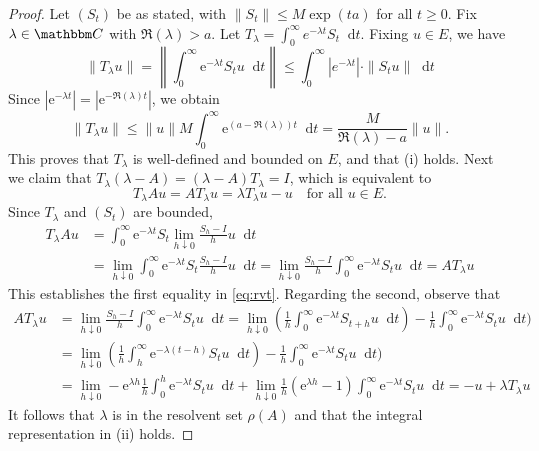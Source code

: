 \documentclass[12pt, reqno]{amsart}
\renewcommand{\leq}{\leqslant}
\renewcommand{\geq}{\geqslant}
\newcommand{\1}{\mathbbm 1}
\newcommand{\me}{{\mathrm e}}
\newcommand*\diff{\mathop{}\!\mathrm{d}}
\newcommand{\CC}{\mathbbm C}
\theoremstyle{plain}
\theoremstyle{definition}
\begin{document}
\begin{proof}
    Let $(S_t)$ be as stated, with $\|S_t\| \leq M \exp(ta)$ for all $t \geq 0$.
    Fix $\lambda \in \CC$ with $\Re(\lambda) > a$. Let
    $T_{\lambda}=\int_{0}^{\infty} e^{-\lambda t}S_t \diff t$.
    Fixing $u\in E$, we have
    \begin{equation*}
        \|T_{\lambda}u\|
        = \left\|
                \int_0^\infty \me^{-\lambda t} S_tu \diff t 
            \right\|
            \leq \int_{0}^{\infty} |e^{-\lambda t} | \cdot \|S_tu\| \diff t
    \end{equation*}
    Since $|\me^{-\lambda t}| = |\me^{- \Re(\lambda) t}|$, we obtain
    \begin{equation*}
        \|T_{\lambda}u\|
        \leq  \|u\| M \int_0^\infty \me^{(a-\Re(\lambda)) t} \diff   t
        = \frac{M}{\Re(\lambda)-a} \|u\| .
    \end{equation*}
    This proves that $T_{\lambda}$ is well-defined and bounded on $E$, and that
    (i) holds.  Next we claim that
	$T_{\lambda}(\lambda - A)  = (\lambda - A)T_{\lambda} = I$,
    which is equivalent to 
    \begin{equation}\label{eq:rvt}
        T_{\lambda}Au = AT_{\lambda}u = \lambda T_{\lambda}u-u
        \quad \text{for all } u \in E.
    \end{equation}
    Since $T_{\lambda}$ and $(S_t)$ are bounded,
    \begin{align*}
    	T_{\lambda} Au
    	& = \int_{0}^{\infty} \me^{-\lambda t}S_t \lim_{h \downarrow 0}
            \frac{S_h-I}{h}u\diff t
        \\
    	& = \lim_{h \downarrow 0}\int_{0}^{\infty} \me^{-\lambda t}S_t 
            \frac{S_h-I}{h}u\diff t
    	= \lim_{h \downarrow 0}\frac{S_h-I}{h}
            \int_0^\infty \me^{-\lambda t}S_t u\diff t = AT_{\lambda}u
    \end{align*}
    This establishes the first equality in \eqref{eq:rvt}.  Regarding the
    second, observe that
    \begin{align*}
       AT_{\lambda}u &
        = \lim_{h \downarrow 0}\frac{S_h-I}{h}
            \int_{0}^{\infty} \me^{-\lambda t}S_t u\diff t 
            = \lim_{h \downarrow 0}
            (\frac{1}{h}\int_{0}^{\infty} \me^{-\lambda t}S_{t+h} u\diff t)
            - \frac{1}{h}\int_{0}^{\infty} \me^{-\lambda t}S_t u\diff t)
        \\
       & = \lim_{h \downarrow 0}(\frac{1}{h}\int_{h}^{\infty} \me^{-\lambda( t-h)}S_{t} u\diff t)
         -\frac{1}{h}\int_{0}^{\infty} \me^{-\lambda t}S_t u\diff t)\\
       & = \lim_{h \downarrow 0}- \me^{\lambda h}\frac{1}{h}\int_{0}^{h} \me^{-\lambda t}S_t u\diff t
            +\lim_{h \downarrow 0}\frac{1}{h}(\me^{\lambda h}-1)
            \int_0^\infty \me^{-\lambda t}S_t u\diff t 
            = -u+\lambda T_{\lambda}u
    \end{align*}
    It follows that $\lambda$ is in the resolvent set $\rho(A)$ and that the
    integral representation in (ii) holds.
\end{proof}
\end{document}
